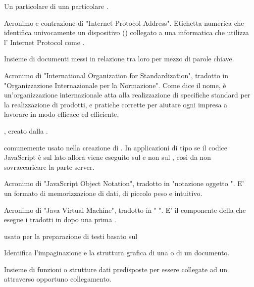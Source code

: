 {Un particolare  di una particolare .}

{Acronimo e contrazione di "Internet Protocol Address". Etichetta numerica che identifica univocamente un dispositivo () collegato a una  informatica che utilizza l' Internet Protocol come .}


{Insieme di documenti messi in relazione tra loro per mezzo di parole chiave.} 


{Acronimo di "International Organization for Standardization", tradotto in "Organizzazione Internazionale per la Normazione". Come dice il nome, è un'organizzazione internazionale atta alla realizzazione di specifiche standard per la realizzazione di prodotti,  e pratiche corrette per aiutare ogni impresa a lavorare in modo efficace ed efficiente.}



{ , creato dalla .}

{ comunemente usato nella creazione di . In applicazioni di tipo  se il codice JavaScript è sul lato  allora viene eseguito sul  e non sul , cosi da non sovraccaricare la parte server.}


{Acronimo di "JavaScript Object Notation", tradotto in "notazione oggetto ". E' un formato di memorizzazione di dati, di piccolo peso e intuitivo.}


{Acronimo di "Java Virtual Machine", tradotto in " ". E' il componente della  che esegue i  tradotti in  dopo una prima .}



{ usato per la preparazione di testi basato sul  }


{Identifica l'impaginazione e la struttura grafica di una  o di un documento.}


{Insieme di funzioni o strutture dati predisposte per essere collegate ad un   attraverso opportuno collegamento.}


